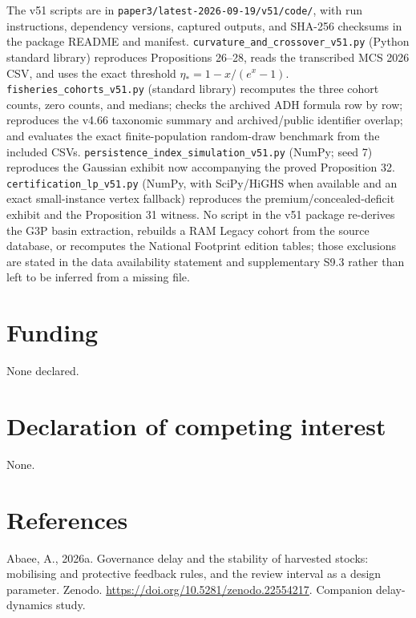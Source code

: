 \documentclass[11pt]{article}
\begin{document}
The v51 scripts are in \texttt{paper3/latest-2026-09-19/v51/code/}, with run instructions, dependency versions, captured outputs, and SHA-256 checksums in the package README and manifest. \texttt{curvature\_and\_crossover\_v51.py} (Python standard library) reproduces Propositions 26--28, reads the transcribed MCS 2026 CSV, and uses the exact threshold \(\eta_*=1-x/(e^x-1)\). \texttt{fisheries\_cohorts\_v51.py} (standard library) recomputes the three cohort counts, zero counts, and medians; checks the archived ADH formula row by row; reproduces the v4.66 taxonomic summary and archived/public identifier overlap; and evaluates the exact finite-population random-draw benchmark from the included CSVs. \texttt{persistence\_index\_simulation\_v51.py} (NumPy; seed 7) reproduces the Gaussian exhibit now accompanying the proved Proposition 32. \texttt{certification\_lp\_v51.py} (NumPy, with SciPy/HiGHS when available and an exact small-instance vertex fallback) reproduces the premium/concealed-deficit exhibit and the Proposition 31 witness. No script in the v51 package re-derives the G3P basin extraction, rebuilds a RAM Legacy cohort from the source database, or recomputes the National Footprint edition tables; those exclusions are stated in the data availability statement and supplementary S9.3 rather than left to be inferred from a missing file.

\section*{Funding}\label{funding}

None declared.

\section*{Declaration of competing interest}\label{declaration-of-competing-interest}

None.

\vspace{0.8em}

\section*{References}\label{references}

Abaee, A., 2026a. Governance delay and the stability of harvested stocks: mobilising and protective feedback rules, and the review interval as a design parameter. Zenodo. \url{https://doi.org/10.5281/zenodo.22554217}. Companion delay-dynamics study.
\end{document}

